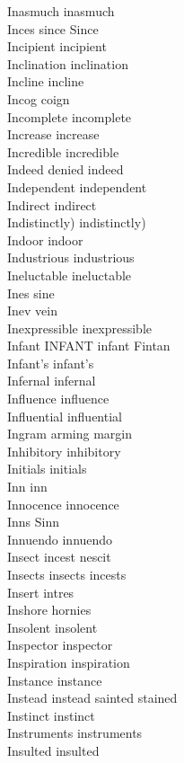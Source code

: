 Inasmuch inasmuch\\
Inces since Since\\
Incipient incipient\\
Inclination inclination\\
Incline incline\\
Incog coign\\
Incomplete incomplete\\
Increase increase\\
Incredible incredible\\
Indeed denied indeed\\
Independent independent\\
Indirect indirect\\
Indistinctly) indistinctly)\\
Indoor indoor\\
Industrious industrious\\
Ineluctable ineluctable\\
Ines sine\\
Inev vein\\
Inexpressible inexpressible\\
Infant INFANT infant Fintan\\
Infant's infant's\\
Infernal infernal\\
Influence influence\\
Influential influential\\
Ingram arming margin\\
Inhibitory inhibitory\\
Initials initials\\
Inn inn\\
Innocence innocence\\
Inns Sinn\\
Innuendo innuendo\\
Insect incest nescit\\
Insects insects incests\\
Insert intres\\
Inshore hornies\\
Insolent insolent\\
Inspector inspector\\
Inspiration inspiration\\
Instance instance\\
Instead instead sainted stained\\
Instinct instinct\\
Instruments instruments\\
Insulted insulted\\
